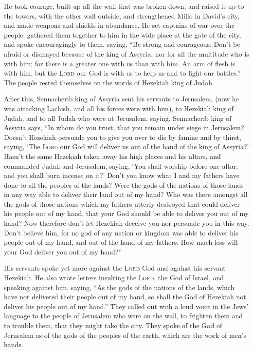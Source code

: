  He took courage, built up all the wall that was broken
down, and raised it up to the towers, with the other wall outside, and
strengthened Millo in David's city, and made weapons and shields in
abundance.  He set captains of war over the people,
gathered them together to him in the wide place at the gate of the city,
and spoke encouragingly to them, saying,  ``Be strong and
courageous. Don't be afraid or dismayed because of the king of Assyria,
nor for all the multitude who is with him; for there is a greater one
with us than with him.  An arm of flesh is with him, but
the \textsc{Lord} our God is with us to help us and to fight our
battles.'' The people rested themselves on the words of Hezekiah king of
Judah.

 After this, Sennacherib king of Assyria sent his servants
to Jerusalem, (now he was attacking Lachish, and all his forces were
with him), to Hezekiah king of Judah, and to all Judah who were at
Jerusalem, saying,  Sennacherib king of Assyria says,
``In whom do you trust, that you remain under siege in Jerusalem?
 Doesn't Hezekiah persuade you to give you over to die by
famine and by thirst, saying, `The \textsc{Lord} our God will deliver us
out of the hand of the king of Assyria?'  Hasn't the same
Hezekiah taken away his high places and his altars, and commanded Judah
and Jerusalem, saying, `You shall worship before one altar, and you
shall burn incense on it?'  Don't you know what I and my
fathers have done to all the peoples of the lands? Were the gods of the
nations of those lands in any way able to deliver their land out of my
hand?  Who was there amongst all the gods of those
nations which my fathers utterly destroyed that could deliver his people
out of my hand, that your God should be able to deliver you out of my
hand?  Now therefore don't let Hezekiah deceive you nor
persuade you in this way. Don't believe him, for no god of any nation or
kingdom was able to deliver his people out of my hand, and out of the
hand of my fathers. How much less will your God deliver you out of my
hand?''

 His servants spoke yet more against the \textsc{Lord}
God and against his servant Hezekiah.  He also wrote
letters insulting the \textsc{Lord}, the God of Israel, and speaking
against him, saying, ``As the gods of the nations of the lands, which
have not delivered their people out of my hand, so shall the God of
Hezekiah not deliver his people out of my hand.''  They
called out with a loud voice in the Jews' language to the people of
Jerusalem who were on the wall, to frighten them and to trouble them,
that they might take the city.  They spoke of the God of
Jerusalem as of the gods of the peoples of the earth, which are the work
of men's hands.

